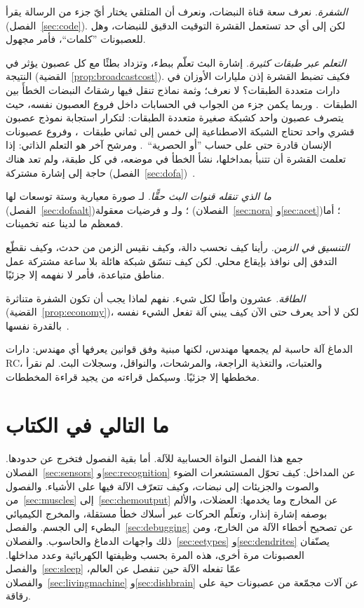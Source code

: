 \emph{الشفرة.} نعرف سعة قناة النبضات، ونعرف أن المتلقي يختار أيّ جزء من الرسالة يقرأ (الفصل~\ref{sec:code}). لكن إلى أي حد تستعمل القشرة التوقيت الدقيق للنبضات، وهل للعصبونات ”كلمات“، فأمر مجهول.

\emph{التعلم عبر طبقات كثيرة.} إشارة البث تعلّم ببطء، وتزداد بطئًا مع كل عصبون يؤثر في النتيجة (القضية~\ref{prop:broadcastcost}). فكيف تضبط القشرة إذن مليارات الأوزان في دارات متعددة الطبقات؟ لا نعرف؛ وثمة نماذج تنقل فيها رشقاتُ النبضات الخطأَ بين الطبقات~\cite{Payeur2021}. وربما يكمن جزء من الجواب في الحسابات داخل فروع العصبون نفسه، حيث يتصرف عصبون واحد كشبكة صغيرة متعددة الطبقات: لتكرار استجابة نموذج عصبون قشري واحد تحتاج الشبكة الاصطناعية إلى خمس إلى ثماني طبقات~\cite{Beniaguev2021}، وفروع عصبونات الإنسان قادرة حتى على حساب ”أو الحصرية“~\cite{Gidon2020}. ومرشح آخر هو التعلم الذاتي: إذا تعلمت القشرة أن تتنبأ بمداخلها، نشأ الخطأ في موضعه، في كل طبقة، ولم تعد هناك حاجة إلى إشارة مشتركة (الفصل~\ref{sec:dofa})~\cite{Keller2018}.

\emph{ما الذي تنقله قنوات البث حقًّا.} لـ صورة معيارية وستة توسعات لها (الفصل~\ref{sec:dofaalt})؛ ولـ و فرضيات معقولة (الفصلان~\ref{sec:nora} و\ref{sec:acet})؛ أما  فمعظم ما لدينا عنه تخمينات.

\emph{التنسيق في الزمن.} رأينا كيف نحسب دالة، وكيف نقيس الزمن من حدث، وكيف نقطّع التدفق إلى نوافذ بإيقاع محلي. لكن كيف تنسّق شبكة هائلة بلا ساعة مشتركة عمل مناطق متباعدة، فأمر لا نفهمه إلا جزئيًا.

\emph{الطاقة.} عشرون واطًا لكل شيء. نفهم لماذا يجب أن تكون الشفرة متناثرة (القضية~\ref{prop:economy})، لكن لا أحد يعرف حتى الآن كيف يبني آلة تفعل الشيء نفسه بالقدرة نفسها~\cite{MehonicKenyon2022}.

الدماغ آلة حاسبة لم يجمعها مهندس، لكنها مبنية وفق قوانين يعرفها أي مهندس: دارات \foreignlanguage{english}{RC}، والعتبات، والتغذية الراجعة، والمرشحات، والنواقل، وسجلات البث. لم نقرأ مخططها إلا جزئيًا. وسيكمل قراءته من يجيد قراءة المخططات.

\section{ما التالي في الكتاب}

جمع هذا الفصل النواة الحسابية للآلة. أما بقية الفصول فتخرج عن حدودها. الفصلان~\ref{sec:sensors} و\ref{sec:recognition} عن المداخل: كيف تحوّل المستشعرات الضوء والصوت والجزيئات إلى نبضات، وكيف تتعرّف الآلة فيها على الأشياء. والفصول من~\ref{sec:muscles} إلى~\ref{sec:chemoutput} عن المخارج وما يخدمها: العضلات، والألم بوصفه إشارة إنذار، وتعلّم الحركات عبر أسلاك خطأ مستقلة، والمخرج الكيميائي البطيء إلى الجسم. والفصل~\ref{sec:debugging} عن تصحيح أخطاء الآلة من الخارج، ومن ذلك واجهات الدماغ والحاسوب. والفصلان~\ref{sec:eetypes} و\ref{sec:dendrites} يصنّفان العصبونات مرة أخرى، هذه المرة بحسب وظيفتها الكهربائية وعدد مداخلها. والفصل~\ref{sec:sleep} عمّا تفعله الآلة حين تنفصل عن العالم، والفصلان~\ref{sec:livingmachine} و\ref{sec:dishbrain} عن آلات مجمّعة من عصبونات حية على رقاقة.

